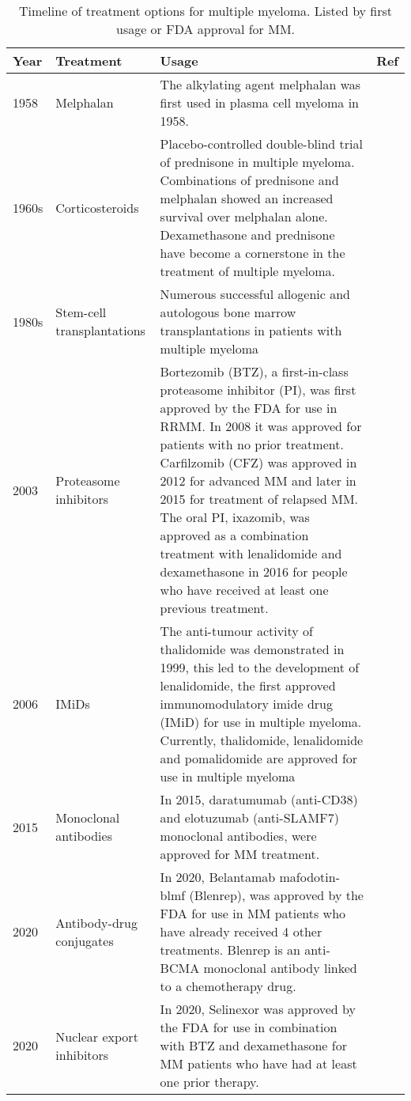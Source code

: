%
%
\begin{table}[hpt]
\centering
\begin{tabular}{|p{1cm}|p{2.8cm}|p{8.3cm}|p{1.28cm}|}
\hline
\textbf{Year} & \textbf{Treatment} & \textbf{Usage} & \textbf{Ref} \\ \hline
1958 & Melphalan & The alkylating agent melphalan was first used in plasma cell myeloma in 1958. & \cite{blokhin1958clinical} \\ \hline
1960s & Corticosteroids & Placebo-controlled double-blind trial of prednisone in multiple myeloma. Combinations of prednisone and melphalan showed an increased survival over melphalan alone. Dexamethasone and prednisone have become a cornerstone in the treatment of multiple myeloma. & \cite{mass1962comparison, alexanian1969treatment} \\ \hline
1980s & Stem-cell transplantations & Numerous successful allogenic and autologous bone marrow transplantations in patients with multiple myeloma &  \cite{mcelwain1983high, osserman1982identical, fefer1986identical, gahrton1987bone}  \\ \hline
2003 & Proteasome inhibitors & Bortezomib (BTZ), a first-in-class proteasome inhibitor (PI), was first approved by the FDA for use in RRMM. In 2008 it was approved for patients with no prior treatment. Carfilzomib (CFZ) was approved in 2012 for advanced MM and later in 2015 for treatment of relapsed MM. The oral PI, ixazomib, was approved as a combination treatment with lenalidomide and dexamethasone in 2016 for people who have received at least one previous treatment. & \cite{kane2003velcade,richardson2003phase,katsnelson2012next} \\ \hline
2006 & IMiDs & The anti-tumour activity of thalidomide was demonstrated in 1999, this led to the development of lenalidomide, the first approved immunomodulatory imide drug (IMiD) for use in multiple myeloma. Currently, thalidomide, lenalidomide and pomalidomide are approved for use in multiple myeloma & \cite{singhal1999antitumor,label47revlimid,san2013pomalidomide} \\ \hline
2015 & Monoclonal antibodies & In 2015, daratumumab (anti-CD38) and elotuzumab (anti-SLAMF7) monoclonal antibodies, were approved for MM treatment. & \cite{lokhorst2015targeting,lonial2015elotuzumab} \\ \hline
2020 & Antibody-drug conjugates & In 2020, Belantamab mafodotin-blmf (Blenrep), was approved by the FDA for use in MM patients who have already received 4 other treatments. Blenrep is an anti-BCMA monoclonal antibody linked to a chemotherapy drug. & \cite{fdaselinexor, podar2020selinexor} \\ \hline
2020 & Nuclear export inhibitors & In 2020, Selinexor was approved by the FDA for use in combination with BTZ and dexamethasone for MM patients who have had at least one prior therapy.& \cite{fdaselinexor, podar2020selinexor} \\ \hline
\end{tabular}
\caption[Timeline of treatment options for multiple myeloma]{Timeline of treatment options for multiple myeloma. Listed by first usage or FDA approval for MM.}
\label{tab:treatment_history}
\end{table}
%

